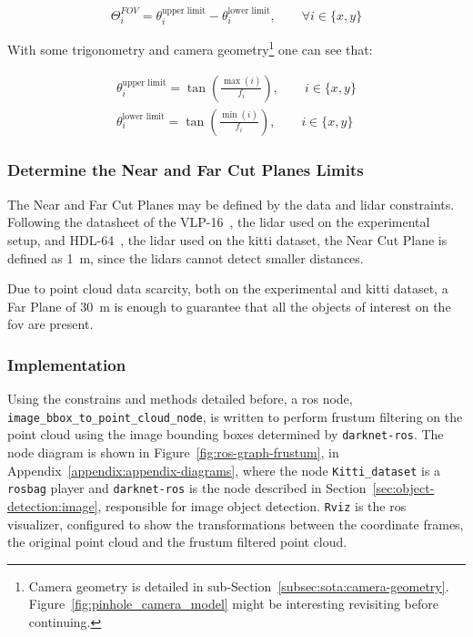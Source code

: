 \begin{equation}
	\label{eq:image-fov}
	\Theta^{FOV}_i = \theta^\text{upper limit}_i - \theta^\text{lower limit}_i, \qquad \forall i \in \{x, y\}
\end{equation}

With some trigonometry and camera geometry\footnote{Camera geometry is detailed in sub-Section~\ref{subsec:sota:camera-geometry}. Figure~\ref{fig:pinhole_camera_model} might be interesting revisiting before continuing.} one can see that:

\begin{align}
	\theta^\text{upper limit}_i = \tan\left(\frac{\max(i)}{f_i}\right), \qquad i \in \{x, y\} \\
	\theta^\text{lower limit}_i = \tan\left(\frac{\min(i)}{f_i}\right), \qquad i \in \{x, y\} 
\end{align}

\subsubsection{Determine the Near and Far Cut Planes Limits}
The Near and Far Cut Planes may be defined by the data and \ac{lidar} constraints. Following the datasheet of the VLP-16~\cite{vlp16}, the \ac{lidar} used on the experimental setup, and HDL-64~\cite{VelodyneHDL64}, the \ac{lidar} used on the \ac{kitti} dataset, the Near Cut Plane is defined as \SI{1}{\meter}, since the \acp{lidar} cannot detect smaller distances.

Due to point cloud data scarcity, both on the experimental and  \ac{kitti} dataset, a Far Plane of \SI{30}{\meter} is enough to guarantee that all the objects of interest on the \ac{fov} are present.

\subsubsection{Implementation}
Using the constrains and methods detailed before, a \ac{ros} node, \texttt{image\_bbox\_to\_point\_cloud\_node}, is written to perform frustum filtering on the point cloud using the image bounding boxes determined by \texttt{darknet-ros}. The node diagram is shown in Figure~\ref{fig:ros-graph-frustum}, in Appendix~\ref{appendix:appendix-diagrams}, where the node \texttt{Kitti\_dataset} is a \texttt{rosbag} player and \texttt{darknet-ros} is the node described in Section~\ref{sec:object-detection:image}, responsible for image object detection. \texttt{Rviz} is the \ac{ros} visualizer, configured to show the transformations between the coordinate frames, the original point cloud and the frustum filtered point cloud.

